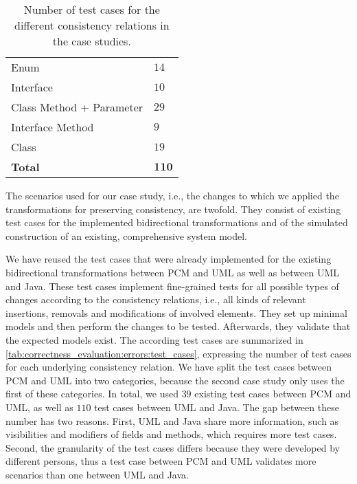 \begin{table}
\begin{tabular}{L{13em}C{8em}}
        Enum                        & $14$ \\
        Interface                   & $10$ \\
        Class Method + Parameter    & $29$ \\
        Interface Method            & $9$ \\
        Class                       & $19$ \\%
        \rowcolor{\headinglinecolor}
        \textbf{Total}              & $\mathbf{110}$ \\
        \bottomrule
    \end{tabular}
    \caption[Number of test cases for case studies]{Number of test cases for the different consistency relations in the case studies.} %
    \label{tab:correctness_evaluation:errors:test_cases}
\end{table}

The scenarios used for our case study, i.e., the changes to which we applied the transformations for preserving consistency, are twofold.
They consist of existing test cases for the implemented bidirectional transformations and of the simulated construction of an existing, comprehensive system model.

We have reused the test cases that were already implemented for the existing bidirectional transformations between \gls{PCM} and \gls{UML} as well as between \gls{UML} and Java.
These test cases implement fine-grained tests for all possible types of changes according to the consistency relations, i.e., all kinds of relevant insertions, removals and modifications of involved elements.
They set up minimal models and then perform the changes to be tested.
Afterwards, they validate that the expected models exist.
The according test cases are summarized in \autoref{tab:correctness_evaluation:errors:test_cases}, expressing the number of test cases for each underlying consistency relation.
We have split the test cases between \gls{PCM} and \gls{UML} into two categories, because the second case study only uses the first of these categories.
In total, we used $39$ existing test cases between \gls{PCM} and \gls{UML}, as well as $110$ test cases between \gls{UML} and Java.
The gap between these number has two reasons. First, \gls{UML} and Java share more information, such as visibilities and modifiers of fields and methods, which requires more test cases. Second, the granularity of the test cases differs because they were developed by different persons, thus a test case between \gls{PCM} and \gls{UML} validates more scenarios than one between \gls{UML} and Java.

